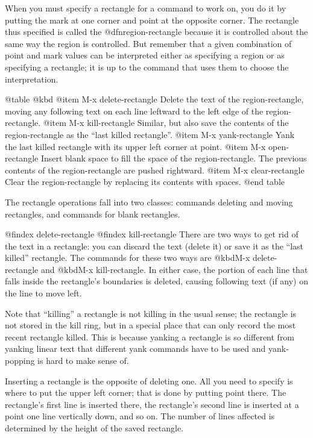 {{{{{{{{  When you must specify a rectangle for a command to work on, you do
it by putting the mark at one corner and point at the opposite corner.
The rectangle thus specified is called the @dfn{region-rectangle}
because it is controlled about the same way the region is controlled.
But remember that a given combination of point and mark values can be
interpreted either as specifying a region or as specifying a
rectangle; it is up to the command that uses them to choose the
interpretation.

@table @kbd
@item M-x delete-rectangle
Delete the text of the region-rectangle, moving any following text on
each line leftward to the left edge of the region-rectangle.
@item M-x kill-rectangle
Similar, but also save the contents of the region-rectangle as the
``last killed rectangle''.
@item M-x yank-rectangle
Yank the last killed rectangle with its upper left corner at point.
@item M-x open-rectangle
Insert blank space to fill the space of the region-rectangle.
The previous contents of the region-rectangle are pushed rightward.
@item M-x clear-rectangle
Clear the region-rectangle by replacing its contents with spaces.
@end table

  The rectangle operations fall into two classes: commands deleting and
moving rectangles, and commands for blank rectangles.

@findex delete-rectangle
@findex kill-rectangle
  There are two ways to get rid of the text in a rectangle: you can discard
the text (delete it) or save it as the ``last killed'' rectangle.  The
commands for these two ways are @kbd{M-x delete-rectangle} and @kbd{M-x
kill-rectangle}.  In either case, the portion of each line that falls inside
the rectangle's boundaries is deleted, causing following text (if any) on
the line to move left.

  Note that ``killing'' a rectangle is not killing in the usual sense; the
rectangle is not stored in the kill ring, but in a special place that
can only record the most recent rectangle killed.  This is because yanking
a rectangle is so different from yanking linear text that different yank
commands have to be used and yank-popping is hard to make sense of.

  Inserting a rectangle is the opposite of deleting one.  All you need to
specify is where to put the upper left corner; that is done by putting
point there.  The rectangle's first line is inserted there, the rectangle's
second line is inserted at a point one line vertically down, and so on.
The number of lines affected is determined by the height of the saved
rectangle.

}}}}}}}}
